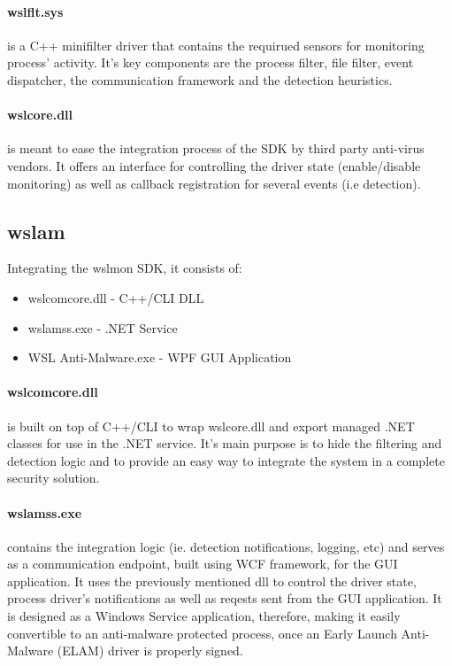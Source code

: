         \paragraph{wslflt.sys}
        is a C++ minifilter driver that contains the requirued sensors for monitoring process' activity. It's key components are the
        process filter, file filter, event dispatcher, the communication framework and the detection heuristics.

        \paragraph{wslcore.dll}
        is meant to ease the integration process of the SDK by third party anti-virus vendors. It offers an interface for controlling the driver
        state (enable/disable monitoring) as well as callback registration for several events (i.e detection).

    \subsection{wslam}
        Integrating the wslmon SDK, it consists of:
        
        \begin{itemize}
            \item wslcomcore.dll - C++/CLI DLL
            \item wslamss.exe - .NET Service
            \item WSL Anti-Malware.exe - WPF GUI Application
        \end{itemize}

        \paragraph{wslcomcore.dll} is built on top of C++/CLI to wrap wslcore.dll and export managed .NET classes
        for use in the .NET service. It's main purpose is to hide the filtering and detection logic and to provide an easy way to integrate
        the system in a complete security solution.

        \paragraph{wslamss.exe} contains the integration logic (ie. detection notifications, logging, etc) and serves as a communication
        endpoint, built using WCF framework, for the GUI application. It uses the previously mentioned dll to control the driver state, process
        driver's notifications as well as reqests sent from the GUI application. It is designed as a Windows Service application, therefore,
        making it easily convertible to an anti-malware protected process, once an Early Launch Anti-Malware (ELAM) driver is properly signed.

